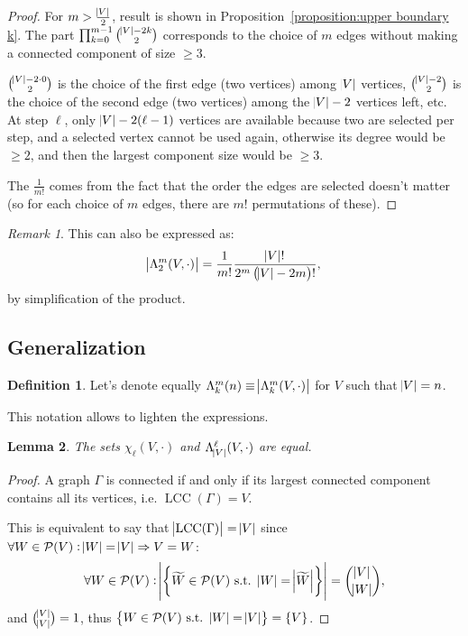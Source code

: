 \documentclass{article}
\newtheorem{lemma}{Lemma}[section]
\theoremstyle{definition}
\newtheorem{definition}[lemma]{Definition}
\theoremstyle{remark}
\newtheorem*{remark}{Remark}
\DeclareMathOperator{\LCC}{LCC}
\newcommand{\st}{\text{ s.t. }}
\begin{document}
		\begin{proof} For $m > \frac {\abs V}2$, result is shown in Proposition~\ref{proposition:upper boundary k}. The part $\prod_{k=0}^{m-1}\binom {\abs V-2k}2$ corresponds
		to the choice of $m$ edges without making a connected component of size $\geq 3$.

		$\binom {\abs V-2 \cdot 0}2$ is the choice of the first edge (two vertices) among $\abs V$ vertices, $\binom {\abs V-2}2$ is the choice of the second edge
		(two vertices) among the $\abs V-2$ vertices left, etc. At step $\ell$, only $\abs V-2(\ell-1)$ vertices are available because two are selected per step, and
		a selected vertex cannot be used again, otherwise its degree would be $\geq 2$, and then the largest component size would be $\geq 3$.

		The $\frac 1{m!}$ comes from the fact that the order the edges are selected doesn't matter (so for each choice of $m$ edges, there are $m!$ permutations
		of these).
		\end{proof}

		\begin{remark} This can also be expressed as:
		\[\abs {\Lambda_2^m(V, \cdot)} = \frac 1{m!}\frac {\abs V!}{2^m\left(\abs V-2m\right)!},\]
		by simplification of the product.
		\end{remark}

	\subsection{Generalization}

	\begin{definition} Let's denote equally $\Lambda_k^m(n) \equiv \abs {\Lambda_k^m(V, \cdot)}$ for $V$ such that $\abs V = n$.
	\end{definition}

	This notation allows to lighten the expressions.

	\begin{lemma} The sets $\chi_\ell(V, \cdot)$ and $\Lambda_{\abs V}^\ell(V, \cdot)$ are equal.
	\end{lemma}

	\begin{proof} A graph $\Gamma$ is connected if and only if its largest connected component contains all its vertices, i.e. $\LCC(\Gamma) = V$.

	This is equivalent to say that $\abs {\LCC(\Gamma)} = \abs V$ since $\forall W \in \mathcal P(V) : \abs W = \abs V \Rightarrow V = W$:
	\[\forall W \in \mathcal P(V) : \abs {\left\{\widetilde W \in \mathcal P(V) \st \abs W = \abs {\widetilde W}\right\}} = \binom {\abs V}{\abs W},\]
	and $\binom {\abs V}{\abs V} = 1$, thus $\left\{W \in \mathcal P(V) \st \abs W = \abs V\right\} = \{V\}$.
	\end{proof}
\end{document}
